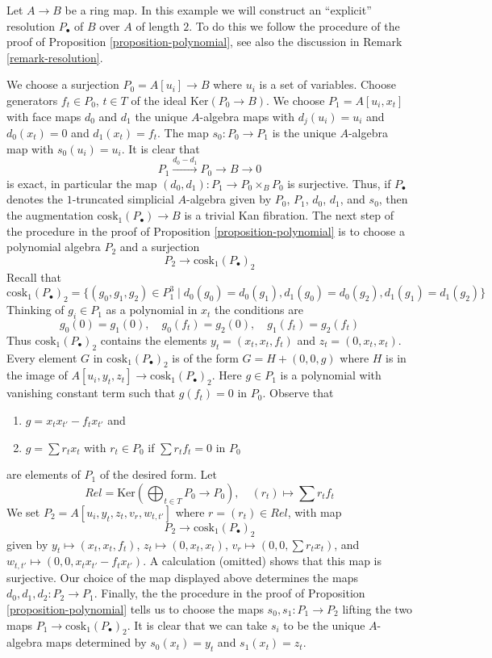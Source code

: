 \begin{example}
\label{example-resolution-length-two}
Let $A \to B$ be a ring map. In this example we 
will construct an ``explicit'' resolution $P_\bullet$ of $B$ over $A$ of
length $2$. To do this we follow the procedure of the proof of
Proposition \ref{proposition-polynomial}, see also the discussion in
Remark \ref{remark-resolution}.

\medskip\noindent
We choose a surjection $P_0 = A[u_i] \to B$ where $u_i$ is a set of
variables. Choose generators $f_t \in P_0$, $t \in T$ of the ideal
$\text{Ker}(P_0 \to B)$. We choose $P_1 = A[u_i, x_t]$ with face maps
$d_0$ and $d_1$ the unique $A$-algebra maps with $d_j(u_i) = u_i$
and $d_0(x_t) = 0$ and $d_1(x_t) = f_t$. The map $s_0 : P_0 \to P_1$
is the unique $A$-algebra map with $s_0(u_i) = u_i$. It is clear that
$$
P_1 \xrightarrow{d_0 - d_1} P_0 \to B \to 0
$$
is exact, in particular the map $(d_0, d_1) : P_1 \to P_0 \times_B P_0$
is surjective. Thus, if $P_\bullet$ denotes the $1$-truncated
simplicial $A$-algebra given by $P_0$, $P_1$, $d_0$, $d_1$, and $s_0$, then
the augmentation $\text{cosk}_1(P_\bullet) \to B$ is a trivial Kan fibration.
The next step of the procedure in the proof of
Proposition \ref{proposition-polynomial}
is to choose a polynomial algebra $P_2$ and a surjection
$$
P_2 \longrightarrow \text{cosk}_1(P_\bullet)_2
$$
Recall that
$$
\text{cosk}_1(P_\bullet)_2 =
\{(g_0, g_1, g_2) \in P_1^3 \mid d_0(g_0) = d_0(g_1),
d_1(g_0) = d_0(g_2), d_1(g_1) = d_1(g_2)\}
$$
Thinking of $g_i \in P_1$ as a polynomial in $x_t$ the conditions
are
$$
g_0(0) = g_1(0),\quad
g_0(f_t) = g_2(0),\quad
g_1(f_t) = g_2(f_t)
$$
Thus $\text{cosk}_1(P_\bullet)_2$ contains the elements
$y_t = (x_t, x_t, f_t)$ and $z_t = (0, x_t, x_t)$.
Every element $G$ in $\text{cosk}_1(P_\bullet)_2$ is
of the form $G = H + (0, 0, g)$ where $H$ is in the image
of $A[u_i, y_t, z_t] \to \text{cosk}_1(P_\bullet)_2$. Here
$g \in P_1$ is a polynomial with vanishing
constant term such that $g(f_t) = 0$ in $P_0$. Observe that
\begin{enumerate}
\item $g = x_t x_{t'} - f_t x_{t'}$ and
\item $g = \sum r_t x_t$ with $r_t \in P_0$ if $\sum r_t f_t = 0$ in $P_0$
\end{enumerate}
are elements of $P_1$ of the desired form. Let
$$
Rel = \text{Ker}(\bigoplus\nolimits_{t \in T} P_0 \longrightarrow P_0),\quad
(r_t) \longmapsto \sum r_tf_t
$$
We set $P_2 = A[u_i, y_t, z_t, v_r, w_{t, t'}]$ where
$r = (r_t) \in Rel$, with map
$$
P_2 \longrightarrow \text{cosk}_1(P_\bullet)_2
$$
given by $y_t  \mapsto (x_t, x_t, f_t)$,
$z_t \mapsto (0, x_t, x_t)$,
$v_r \mapsto (0, 0, \sum r_t x_t)$, and
$w_{t, t'} \mapsto (0, 0, x_t x_{t'} - f_t x_{t'})$. A calculation
(omitted) shows that this map is surjective. Our choice of the
map displayed above determines the maps $d_0, d_1, d_2 : P_2 \to P_1$.
Finally, the the procedure in the proof of
Proposition \ref{proposition-polynomial}
tells us to choose the maps $s_0, s_1 : P_1 \to P_2$ lifting the two
maps $P_1 \to \text{cosk}_1(P_\bullet)_2$. It is clear that we can take
$s_i$ to be the unique $A$-algebra maps determined by
$s_0(x_t) = y_t$ and $s_1(x_t) = z_t$.




\end{example}
